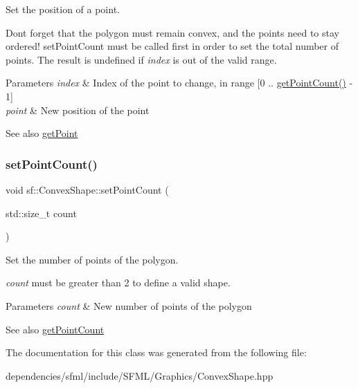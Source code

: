 Set the position of a point. 

Don\textquotesingle{}t forget that the polygon must remain convex, and the points need to stay ordered! set\+Point\+Count must be called first in order to set the total number of points. The result is undefined if {\itshape index} is out of the valid range.


\begin{DoxyParams}{Parameters}
{\em index} & Index of the point to change, in range \mbox{[}0 .. \hyperlink{classsf_1_1_convex_shape_a0c54b8d48fe4e13414f6e667dbfc22a3}{get\+Point\+Count()} -\/ 1\mbox{]} \\
\hline
{\em point} & New position of the point\\
\hline
\end{DoxyParams}
\begin{DoxySeeAlso}{See also}
\hyperlink{classsf_1_1_convex_shape_a72a97bc426d8daf4d682a20fcb7f3fe7}{get\+Point} 
\end{DoxySeeAlso}
\mbox{\label{classsf_1_1_convex_shape_a56e6e79ade6dd651cc1a0e39cb68deae}} 
\subsubsection{\texorpdfstring{set\+Point\+Count()}{setPointCount()}}
{\footnotesize\ttfamily void sf\+::\+Convex\+Shape\+::set\+Point\+Count (\begin{DoxyParamCaption}\item[{std\+::size\+\_\+t}]{count }\end{DoxyParamCaption})}



Set the number of points of the polygon. 

{\itshape count} must be greater than 2 to define a valid shape.


\begin{DoxyParams}{Parameters}
{\em count} & New number of points of the polygon\\
\hline
\end{DoxyParams}
\begin{DoxySeeAlso}{See also}
\hyperlink{classsf_1_1_convex_shape_a0c54b8d48fe4e13414f6e667dbfc22a3}{get\+Point\+Count} 
\end{DoxySeeAlso}


The documentation for this class was generated from the following file\+:\begin{DoxyCompactItemize}
\item 
dependencies/sfml/include/\+S\+F\+M\+L/\+Graphics/Convex\+Shape.\+hpp\end{DoxyCompactItemize}
